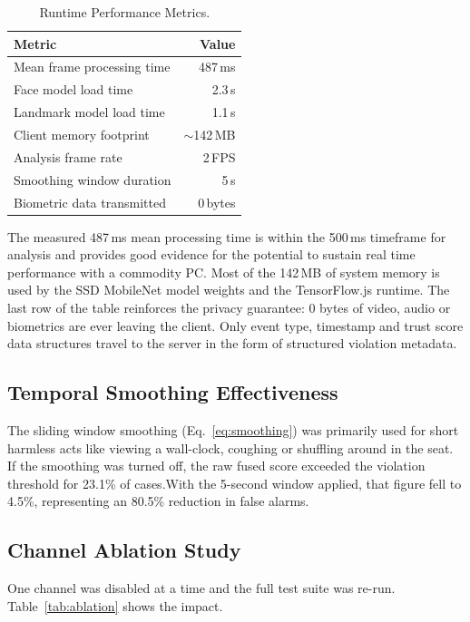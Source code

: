 \documentclass[runningheads]{llncs}
\begin{document}
\begin{table}[htbp]
\caption{Runtime Performance Metrics.}\label{tab:performance}
\centering
\begin{tabular}{@{}lr@{}}
\toprule
\textbf{Metric} & \textbf{Value} \\
\midrule
Mean frame processing time   & 487\,ms \\
Face model load time         & 2.3\,s \\
Landmark model load time     & 1.1\,s \\
Client memory footprint      & $\sim$142\,MB \\
Analysis frame rate          & 2\,FPS \\
Smoothing window duration    & 5\,s \\
Biometric data transmitted   & 0\,bytes \\
\bottomrule
\end{tabular}
\end{table}

The measured 487\,ms mean processing time is within the 500\,ms timeframe for analysis and provides good evidence for the potential to sustain real time performance with a commodity PC. Most of the 142\,MB of system memory is used by the SSD MobileNet model weights and the TensorFlow.js runtime. The last row of the table reinforces the privacy guarantee: 0 bytes of video, audio or biometrics are ever leaving the client. Only event type, timestamp and trust score data structures travel to the server in the form of structured violation metadata.

\subsection{Temporal Smoothing Effectiveness}

The sliding window smoothing (Eq.~\ref{eq:smoothing}) was primarily used for short harmless acts like viewing a wall-clock, coughing or shuffling around in the seat. If the smoothing was turned off, the raw fused score exceeded the violation threshold for 23.1\% of cases.With the 5-second window applied, that figure fell to 4.5\%, representing an 80.5\% reduction in false alarms.

\subsection{Channel Ablation Study}\label{subsec:ablation}

One channel was disabled at a time and the full test suite was re-run. Table~\ref{tab:ablation} shows the impact.
\end{document}
